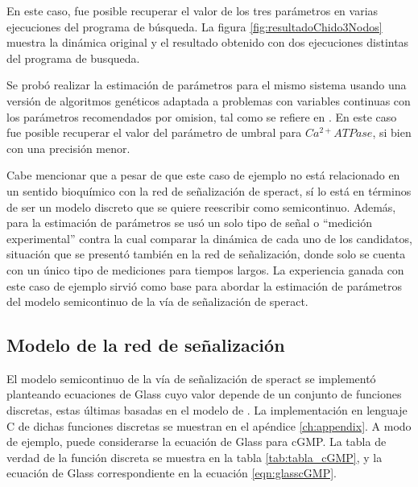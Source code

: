 En este caso, fue posible recuperar el valor de los tres parámetros en varias ejecuciones del programa de búsqueda. La figura \ref{fig:resultadoChido3Nodos} muestra la dinámica original y el resultado obtenido con dos ejecuciones distintas del programa de busqueda.

Se probó realizar la estimación de parámetros para el mismo sistema usando una versión de algoritmos genéticos adaptada a problemas con variables continuas con los parámetros recomendados por omision, tal como se refiere en \citeauthor{Haupt1998} \citep{Haupt1998}. En este caso fue posible recuperar el valor del parámetro de umbral para $Ca^{2+}ATPase$, si bien con una precisión menor.

Cabe mencionar que a pesar de que este caso de ejemplo no está relacionado en un sentido bioquímico con la red de señalización de speract, sí lo está en términos de ser un modelo discreto que se quiere reescribir como semicontinuo. Además, para la estimación de parámetros se usó un solo tipo de señal o ``medición experimental'' contra la cual comparar la dinámica de cada uno de los candidatos, situación que se presentó también en la red de señalización, donde solo se cuenta con un único tipo de mediciones para tiempos largos. La experiencia ganada con este caso de ejemplo sirvió como base para abordar la estimación de parámetros del modelo semicontinuo de la vía de señalización de speract.

\subsection{Modelo de la red de señalización}

El modelo semicontinuo de la vía de señalización de speract se implementó planteando ecuaciones de Glass cuyo valor depende de un conjunto de funciones discretas, estas últimas basadas en el modelo de \citeauthor{Espinal2011} \citep{Espinal2011}. La implementación en lenguaje C de dichas funciones discretas se muestran en el apéndice \ref{ch:appendix}. A modo de ejemplo, puede considerarse la ecuación de Glass para cGMP. La tabla de verdad de la función discreta se muestra en la tabla \ref{tab:tabla_cGMP}, y la ecuación de Glass correspondiente en la ecuación \ref{eqn:glasscGMP}.

